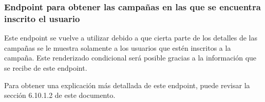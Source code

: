 \subsubsection{Endpoint para obtener las campañas en las que se encuentra inscrito el usuario}
Este endpoint se vuelve a utilizar debido a que cierta parte de los detalles de las campañas se le muestra solamente a los usuarios que estén inscritos a la campaña. Este renderizado condicional será posible gracias a la información que se recibe de este endpoint.

Para obtener una explicación más detallada de este endpoint, puede revisar la sección 6.10.1.2 de este documento.
